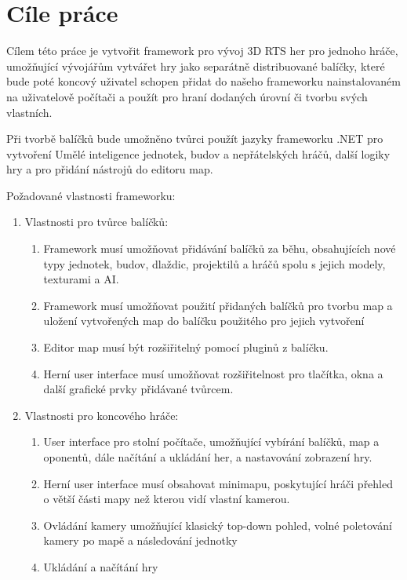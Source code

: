 \section{Cíle práce}
Cílem této práce je vytvořit framework pro vývoj 3D RTS her pro jednoho hráče, umožňující vývojářům vytvářet hry jako separátně 
distribuované balíčky, které bude poté koncový uživatel schopen přidat do našeho frameworku nainstalovaném na uživatelově počítači a použít pro hraní dodaných úrovní či tvorbu svých vlastních.

Při tvorbě balíčků bude umožněno tvůrci použít jazyky frameworku .NET  pro vytvoření Umělé inteligence jednotek, budov a nepřátelských hráčů, další logiky hry a pro přidání nástrojů do editoru map.

Požadované vlastnosti frameworku:
\begin{enumerate}
	\item Vlastnosti pro tvůrce balíčků:
		\begin{enumerate}
			\item Framework musí umožňovat přidávání balíčků za běhu, obsahujících nové typy jednotek, budov,  dlaždic, projektilů a hráčů spolu s jejich modely, texturami a AI.
			\item Framework musí umožňovat použití přidaných balíčků pro tvorbu map a uložení vytvořených map do balíčku použitého pro jejich vytvoření
			\item Editor map musí být rozšiřitelný pomocí pluginů z balíčku.
			\item Herní user interface musí umožňovat rozšiřitelnost pro tlačítka, okna a další grafické prvky přidávané tvůrcem.
		\end{enumerate}

	\item Vlastnosti pro koncového hráče:
		\begin{enumerate}
			\item User interface pro stolní počítače, umožňující vybírání balíčků, map a oponentů, dále načítání a ukládání her, a nastavování zobrazení hry.
			\item Herní user interface musí obsahovat minimapu, poskytující hráči přehled o větší části mapy než kterou vidí vlastní kamerou.
			\item Ovládání kamery umožňující klasický top-down pohled, volné poletování kamery po mapě a následování jednotky
			\item Ukládání a načítání hry
		\end{enumerate}
\end{enumerate}
